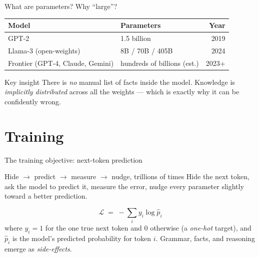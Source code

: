 \documentclass[aspectratio=169,11pt]{beamer}
\begin{document}
\begin{frame}{What are parameters? Why ``large''?}
  \small
  \begin{center}
  \begin{tabular}{llr}
    \toprule
    \textbf{Model} & \textbf{Parameters} & \textbf{Year} \\
    \midrule
    GPT-2                            & 1.5 billion                  & 2019 \\
    Llama-3 (open-weights)           & 8B / 70B / 405B              & 2024 \\
    Frontier (GPT-4, Claude, Gemini) & hundreds of billions (est.)  & 2023+ \\
    \bottomrule
  \end{tabular}
  \end{center}
  \begin{alertblock}{Key insight}
    There is \emph{no} manual list of facts inside the model. Knowledge is \emph{implicitly distributed} across all the weights --- which is exactly why it can be confidently wrong.
  \end{alertblock}
\end{frame}

\section{Training}
\begin{frame}{The training objective: next-token prediction}
  \begin{block}{Hide $\to$ predict $\to$ measure $\to$ nudge, trillions of times}
    Hide the next token, ask the model to predict it, measure the error, nudge every parameter slightly toward a better prediction.
  \end{block}
  \[
    \mathcal{L} \;=\; -\sum_i y_i \log \hat{p}_i
  \]
  where $y_i = 1$ for the one true next token and $0$ otherwise (a \emph{one-hot} target), and $\hat{p}_i$ is the model's predicted probability for token $i$. Grammar, facts, and reasoning emerge as \emph{side-effects}.
\end{frame}
\end{document}

